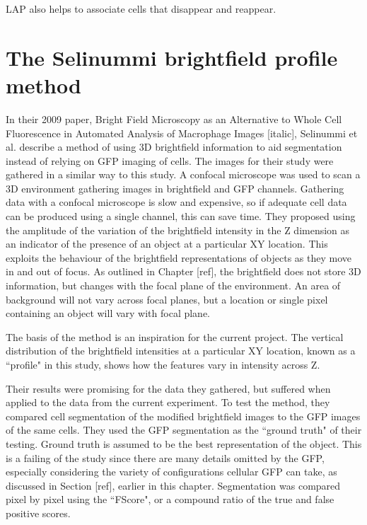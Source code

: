 LAP also helps to associate cells that disappear and reappear.

\section{The Selinummi brightfield profile method}

In their 2009 paper, Bright Field Microscopy as an Alternative to Whole Cell Fluorescence in Automated Analysis of Macrophage Images [italic], Selinummi et al. describe a method of using 3D brightfield information to aid segmentation instead of relying on GFP imaging of cells. The images for their study were gathered in a similar way to this study. A confocal microscope was used to scan a 3D environment gathering images in brightfield and GFP channels. Gathering data with a confocal microscope is slow and expensive, so if adequate cell data can be produced using a single channel, this can save time. They proposed using the amplitude of the variation of the brightfield intensity in the Z dimension as an indicator of the presence of an object at a particular XY location. This exploits the behaviour of the brightfield representations of objects as they move in and out of focus. As outlined in Chapter [ref], the brightfield does not store 3D information, but changes with the focal plane of the environment. An area of background will not vary across focal planes, but a location or single pixel containing an object will vary with focal plane.

The basis of the method is an inspiration for the current project. The vertical distribution of the brightfield intensities at a particular XY location, known as a ``profile" in this study, shows how the features vary in intensity across Z.

Their results were promising for the data they gathered, but suffered when applied to the data from the current experiment. To test the method, they compared cell segmentation of the modified brightfield images to the GFP images of the same cells. They used the GFP segmentation as the ``ground truth" of their testing. Ground truth is assumed to be the best representation of the object. This is a failing of the study since there are many details omitted by the GFP, especially considering the variety of configurations cellular GFP can take, as discussed in Section [ref], earlier in this chapter. Segmentation was compared pixel by pixel using the ``FScore", or a compound ratio of the true and false positive scores.

